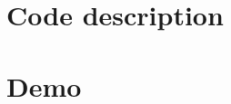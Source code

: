 \documentclass[conference]{IEEEtran}
\begin{document}
\section{Code description}

\section{Demo}
%
\end{document}

